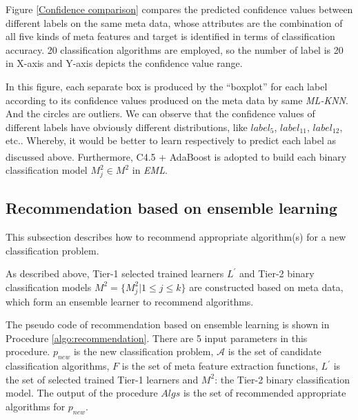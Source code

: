 \documentclass[review,3p,twocolumn,times]{elsarticle}
\newcommand{\upcite}[1]{\textsuperscript{\cite{#1}}}
\begin{document}
Figure \ref{Confidence comparison} compares the predicted confidence values between different labels on the same meta data, whose attributes are the combination of all five kinds of meta features and target is identified in terms of classification accuracy. 20 classification algorithms are employed, so the number of label is 20 in X-axis and Y-axis depicts the confidence value range. 

In this figure, each separate box is produced by the “boxplot” for each label according to its confidence values produced on the meta data by same \emph{ML-KNN}. And the circles are outliers. We can observe that the confidence values of different labels have obviously different distributions, like $label_5$, $label_{11}$, $label_{12}$, etc.. Whereby, it would be better to learn respectively to predict each label as discussed above. Furthermore, C4.5\upcite{Quinlan1993Programs} + AdaBoost\upcite{Freund1995A} is adopted to build each binary classification model \emph{$M^2_j \in M^2$} in \emph{EML}. 


\subsection{Recommendation based on ensemble learning}

This subsection describes how to recommend appropriate algorithm(s) for a new classification problem.

As described above, Tier-1 selected trained learners $L^{'}$ and Tier-2 binary classification models $M^2 =\{M^2_j|1 \leq j \leq k\}$ are constructed based on meta data, which form an ensemble learner to recommend algorithms.

The pseudo code of recommendation based on ensemble learning is shown in Procedure \ref{algo:recommendation}. There are 5 input parameters in this procedure. $p_{new}$ is the new classification problem, $\mathcal{A}$ is the set of candidate classification algorithms, $F$ is the set of meta feature extraction functions, $L^{'}$ is the set of selected trained Tier-1 learners and $M^2$: the Tier-2 binary classification model. The output of the procedure \emph{$Algs$} is the set of recommended appropriate algorithms for $p_{new}$.
\end{document}

